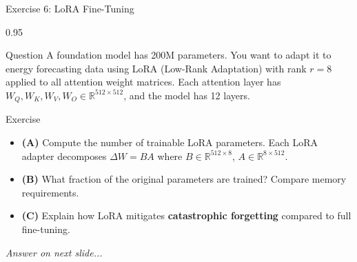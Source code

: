 \documentclass[9pt, aspectratio=169, t]{beamer}
\begin{document}
\begin{frame}{Exercise 6: LoRA Fine-Tuning}
    \begin{cminipage}{0.95\textwidth}
    \begin{alertblock}{Question}
        A foundation model has 200M parameters. You want to adapt it to energy forecasting data using LoRA (Low-Rank Adaptation) with rank $r = 8$ applied to all attention weight matrices. Each attention layer has $W_Q, W_K, W_V, W_O \in \mathbb{R}^{512 \times 512}$, and the model has 12 layers.
    \end{alertblock}

    \vspace{0.15cm}

    \begin{block}{Exercise}
        \begin{itemize}\setlength{\itemsep}{3pt}
            \item \textcolor{MainBlue}{\textbf{(A)}} Compute the number of trainable LoRA parameters. Each LoRA adapter decomposes $\Delta W = BA$ where $B \in \mathbb{R}^{512 \times 8}$, $A \in \mathbb{R}^{8 \times 512}$.
            \item \textcolor{MainBlue}{\textbf{(B)}} What fraction of the original parameters are trained? Compare memory requirements.
            \item \textcolor{MainBlue}{\textbf{(C)}} Explain how LoRA mitigates \textbf{catastrophic forgetting} compared to full fine-tuning.
        \end{itemize}
    \end{block}

    \vspace{0.15cm}

    \begin{center}
        \textit{Answer on next slide...}
    \end{center}
    \end{cminipage}
\end{frame}
\end{document}
